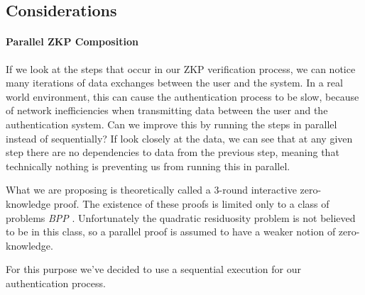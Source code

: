 \subsection{Considerations}
\paragraph{Parallel ZKP Composition}
If we look at the steps that occur in our ZKP verification process, we can notice many iterations of data exchanges between the user and the system.
In a real world environment, this can cause the authentication process to be slow, because of network inefficiencies when transmitting data between the user and the authentication system.
Can we improve this by running the steps in parallel instead of sequentially?
If look closely at the data, we can see that at any given step there are no dependencies to data from the previous step, meaning that technically nothing is preventing us from running this in parallel.

What we are proposing is theoretically called a 3-round interactive zero-knowledge proof.
The existence of these proofs is limited only to a class of problems \textit{BPP} \cite{goldreich1996composition}.
Unfortunately the quadratic residuosity problem is not believed to be in this class, so a parallel proof is assumed to have a weaker notion of zero-knowledge.

For this purpose we've decided to use a sequential execution for our authentication process.


%
%
%





